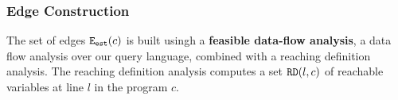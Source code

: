 
  
\subsubsection{Edge Construction}
The set of edges $\mathtt{{E_{est}}}(c)$ is built usingh a \textbf{feasible data-flow analysis}, 
a data flow analysis over 
our query language, combined with a reaching definition analysis.
The reaching definition analysis computes a set $\mathtt{RD}(l, c)$ of reachable 
variables at line $l$ in the program $c$.

